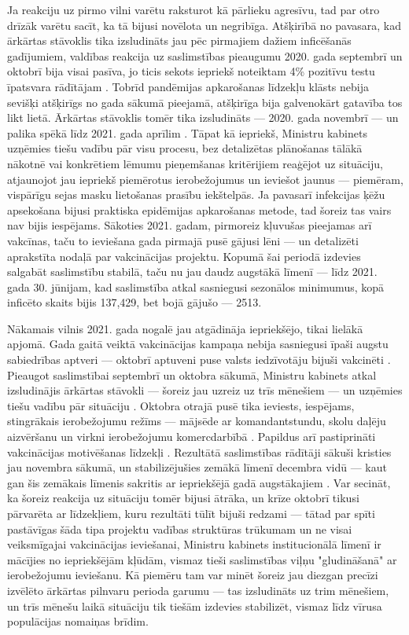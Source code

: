 \documentclass[12pt, a4paper]{article}
\numberwithin{equation}{section} %
\begin{document}
Ja reakciju uz pirmo vilni varētu raksturot kā pārlieku agresīvu, tad par otro drīzāk varētu sacīt, ka tā bijusi novēlota un negribīga. Atšķirībā no pavasara, kad ārkārtas stāvoklis tika izsludināts jau pēc pirmajiem dažiem inficēšanās gadījumiem, valdības reakcija uz saslimstības pieaugumu 2020. gada septembrī un oktobrī bija visai pasīva, jo ticis sekots iepriekš noteiktam 4\% pozitīvu testu īpatsvara rādītājam \cite{lv_october_2020_spread}. Tobrīd pandēmijas apkarošanas līdzekļu klāsts nebija sevišķi atšķirīgs no gada sākumā pieejamā, atšķirīga bija galvenokārt gatavība tos likt lietā. Ārkārtas stāvoklis tomēr tika izsludināts --- 2020. gada novembrī --- un palika spēkā līdz 2021. gada aprīlim \cite{lv_emergency_2020_fall}. Tāpat kā iepriekš, Ministru kabinets uzņēmies tiešu vadību pār visu procesu, bez detalizētas plānošanas tālākā nākotnē vai konkrētiem lēmumu pieņemšanas kritērijiem reaģējot uz situāciju, atjaunojot jau iepriekš piemērotus ierobežojumus un ieviešot jaunus --- piemēram, vispārīgu sejas masku lietošanas prasību iekštelpās. Ja pavasarī infekcijas ķēžu apsekošana bijusi praktiska epidēmijas apkarošanas metode, tad šoreiz tas vairs nav bijis iespējams. Sākoties 2021. gadam, pirmoreiz kļuvušas pieejamas arī vakcīnas, taču to ieviešana gada pirmajā pusē gājusi lēni --- un detalizēti aprakstīta nodaļā par vakcinācijas projektu. Kopumā šai periodā izdevies salgabāt saslimstību stabilā, taču nu jau daudz augstākā līmenī --- līdz 2021. gada 30. jūnijam, kad saslimstība atkal sasniegusi sezonālos minimumus, kopā inficēto skaits bijis 137,429, bet bojā gājušo --- 2513.

Nākamais vilnis 2021. gada nogalē jau atgādināja iepriekšējo, tikai lielākā apjomā. Gada gaitā veiktā vakcinācijas kampaņa nebija sasniegusi īpaši augstu sabiedrības aptveri --- oktobrī aptuveni puse valsts iedzīvotāju bijuši vakcinēti \cite{lv_vaccine_half_2021_october}. Pieaugot saslimstībai septembrī un oktobra sākumā, Ministru kabinets atkal izsludinājis ārkārtas stāvokli --- šoreiz jau uzreiz uz trīs mēnešiem --- un uzņēmies tiešu vadību pār situāciju \cite{lv_emergency_2021}. Oktobra otrajā pusē tika ieviests, iespējams, stingrākais ierobežojumu režīms --- mājsēde ar komandantstundu, skolu daļēju aizvēršanu un virkni ierobežojumu komercdarbībā \cite{lv_lockdown_2021}. Papildus arī pastiprināti vakcinācijas motivēšanas līdzekļi \cite{lv_fire_unvaccinated}. Rezultātā saslimstības rādītāji sākuši kristies jau novembra sākumā, un stabilizējušies zemākā līmenī decembra vidū --- kaut gan šis zemākais līmenis sakritis ar iepriekšējā gadā augstākajiem \cite{lv_stats}. Var secināt, ka šoreiz reakcija uz situāciju tomēr bijusi ātrāka, un krīze oktobrī tikusi pārvarēta ar līdzekļiem, kuru rezultāti tūlīt bijuši redzami --- tātad par spīti pastāvīgas šāda tipa projektu vadības struktūras trūkumam un ne visai veiksmīgajai vakcinācijas ieviešanai, Ministru kabinets institucionālā līmenī ir mācījies no iepriekšējām kļūdām, vismaz tieši saslimstības viļņu "gludināšanā" ar ierobežojumu ieviešanu. Kā piemēru tam var minēt šoreiz jau diezgan precīzi izvēlēto ārkārtas pilnvaru perioda garumu --- tas izsludināts uz trim mēnešiem, un trīs mēnešu laikā situāciju tik tiešām izdevies stabilizēt, vismaz līdz vīrusa populācijas nomaiņas brīdim. 
\end{document}
